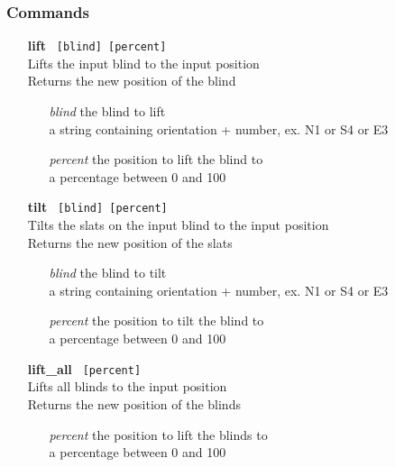\documentclass[twoside]{article}
\begin{document}
	
	\subsubsection{Commands}
	
	\begin{enumerate}
		\item[\bf lift]\verb| [blind] [percent]|\\
		Lifts the input blind to the input position\\
		Returns the new position of the blind
	
		\begin{enumerate}[leftmargin=3\parindent]
			\item[\it blind] the blind to lift\\
			a string containing orientation + number, ex. N1 or S4 or E3
			\item[\it percent] the position to lift the blind to\\
			a percentage between 0 and 100
		\end{enumerate}
	
		\item[\bf tilt]\verb| [blind] [percent]|\\
		Tilts the slats on the input blind to the input position\\
		Returns the new position of the slats
	
		\begin{enumerate}[leftmargin=3\parindent]
			\item[\it blind] the blind to tilt\\
			a string containing orientation + number, ex. N1 or S4 or E3
			\item[\it percent] the position to tilt the blind to\\
			a percentage between 0 and 100
		\end{enumerate}
		
		\item[\bf lift\_all]\verb| [percent]|\\
		Lifts all blinds to the input position\\
		Returns the new position of the blinds
		
		\begin{enumerate}[leftmargin=3\parindent]
			\item[\it percent] the position to lift the blinds to\\
			a percentage between 0 and 100
		\end{enumerate}
		

\end{enumerate}
\end{document}
